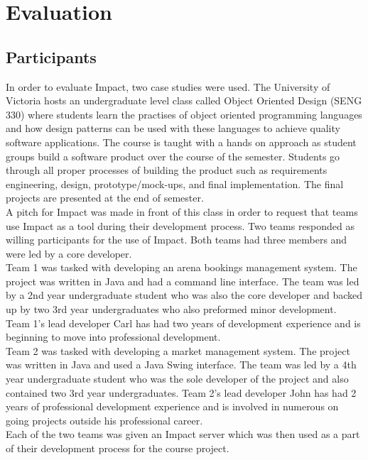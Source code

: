 \documentclass[conference]{IEEEtran}
\begin{document}
\section{Evaluation}

\subsection{Participants}
In order to evaluate Impact, two case studies were used. The University of Victoria hosts an undergraduate
level class called Object Oriented Design (SENG 330) where students learn the practises of object oriented
programming languages and how design patterns can be used with these languages to achieve quality 
software applications. The course is taught with a hands on approach as student groups build a software
product over the course of the semester. Students go through all proper processes of building the product
such as requirements engineering, design, prototype/mock-ups, and final implementation. 
The final projects are presented at the end of semester. \\

A pitch for Impact was made in front of this class in order to request that teams use Impact as a tool during 
their development process. Two teams responded as willing participants for the use of Impact. Both teams 
had three members and were led by a core developer. \\

Team 1 was tasked with developing an arena bookings management system. The project was written in
Java and had a command line interface. The team was led by a 2nd year undergraduate student who was
also the core developer and backed up by two 3rd year undergraduates who also preformed minor
development. Team 1's lead developer Carl has had two years of development experience and is 
beginning to move into professional development.\\

Team 2 was tasked with developing a market management system. The project was written in Java
and used a Java Swing interface. The team was led by a 4th year undergraduate student who was
the sole developer of the project and also contained two 3rd year undergraduates. Team 2's lead
developer John has had 2 years of professional development experience and is involved in numerous
on going projects outside his professional career.\\

Each of the two teams was given an Impact server which was then used as a part of their development
process for the course project.
\end{document}
